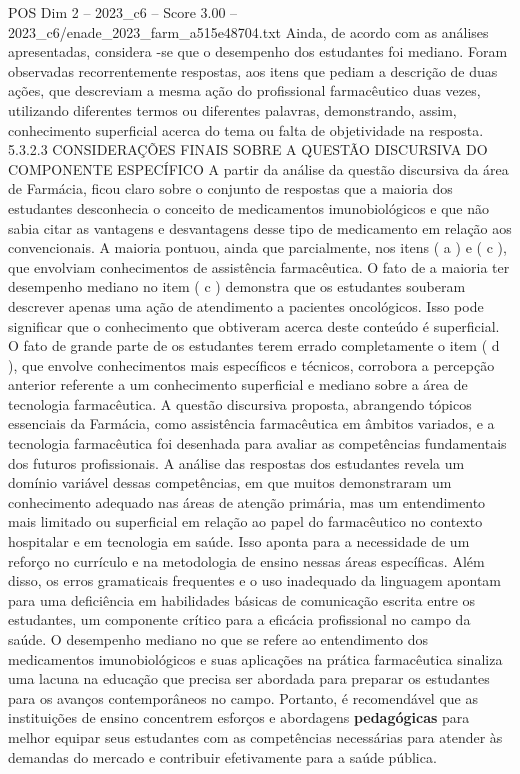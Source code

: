 \begin{textsample}{POS Dim 2 – 2023\_c6 – Score 3.00 – 2023\_c6/enade\_2023\_farm\_a515e48704.txt}
Ainda, de acordo com as análises apresentadas, considera -se que o desempenho dos estudantes foi mediano.
Foram observadas recorrentemente respostas, aos itens que pediam a descrição de duas ações, que descreviam a mesma ação do profissional farmacêutico duas vezes, utilizando diferentes termos ou diferentes palavras, demonstrando, assim, conhecimento superficial acerca do tema ou falta de objetividade na resposta. 5.3.2.3 CONSIDERAÇÕES FINAIS SOBRE A QUESTÃO DISCURSIVA DO COMPONENTE ESPECÍFICO A partir da análise da questão discursiva da área de Farmácia, ficou claro sobre o conjunto de respostas que a maioria dos estudantes desconhecia o conceito de medicamentos imunobiológicos e que não sabia citar as vantagens e desvantagens desse tipo de medicamento em relação aos convencionais.
A maioria pontuou, ainda que parcialmente, nos itens ( a ) e ( c ), que envolviam conhecimentos de assistência farmacêutica.
O fato de a maioria ter desempenho mediano no item ( c ) demonstra que os estudantes souberam descrever apenas uma ação de atendimento a pacientes oncológicos.
Isso pode significar que o conhecimento que obtiveram acerca deste conteúdo é superficial.
O fato de grande parte de os estudantes terem errado completamente o item ( d ), que envolve conhecimentos mais específicos e técnicos, corrobora a percepção anterior referente a um conhecimento superficial e mediano sobre a área de tecnologia farmacêutica.
A questão discursiva proposta, abrangendo tópicos essenciais da Farmácia, como assistência farmacêutica em âmbitos variados, e a tecnologia farmacêutica foi desenhada para avaliar as competências fundamentais dos futuros profissionais.
A análise das respostas dos estudantes revela um domínio variável dessas competências, em que muitos demonstraram um conhecimento adequado nas áreas de atenção primária, mas um entendimento mais limitado ou superficial em relação ao papel do farmacêutico no contexto hospitalar e em tecnologia em saúde.
Isso aponta para a necessidade de um reforço no currículo e na metodologia de ensino nessas áreas específicas.
Além disso, os erros gramaticais frequentes e o uso inadequado da linguagem apontam para uma deficiência em habilidades básicas de comunicação escrita entre os estudantes, um componente crítico para a eficácia profissional no campo da saúde.
O desempenho mediano no que se refere ao entendimento dos medicamentos imunobiológicos e suas aplicações na prática farmacêutica sinaliza uma lacuna na educação que precisa ser abordada para preparar os estudantes para os avanços contemporâneos no campo.
Portanto, é recomendável que as instituições de ensino concentrem esforços e abordagens \textbf{pedagógicas} para melhor equipar seus estudantes com as competências necessárias para atender às demandas do mercado e contribuir efetivamente para a saúde pública.

\end{textsample}
